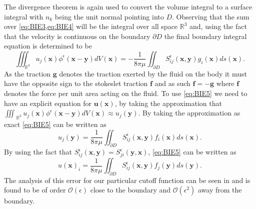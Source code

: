 The divergence theorem is again used to convert the volume integral to a surface integral with $n_k$ being the unit normal pointing into $D$. Observing that the sum over \cref{eq:BIE3,eq:BIE4} will be the integral over all space $\mathbb{R}^{3}$ and, using the fact that the velocity is continuous on the boundary $\partial D$ the final boundary integral equation is determined to be
\begin{equation}
  \label{eq:BIE5}
    \iiint_{\mathbb{R}^{3}} u_{j}(\bm{x}) \phi^{\epsilon}\left(\bm{x}-\bm{y}\right) d V(\bm{x})=-\frac{1}{8 \pi \mu} \iint_{\partial D} S_{i j}^{\epsilon}\left(\bm{x}, \bm{y}\right) g_{i}(\bm{x}) d s(\bm{x}).
\end{equation}
As the traction $\bm{g}$ denotes the traction exerted by the fluid on the body it must have the opposite sign to the stokeslet traction $\bm{f}$ and as such $\bm{f} = -\bm{g}$ where $\bm{f}$ denotes the force per unit area acting on the fluid. To use \cref{eq:BIE5} we need to have an explicit equation for $\bm{u}(\bm{x})$, by taking the approximation that $\iiint_{\;\mathbb{R}^{3}} u_{j}(\bm{x}) \phi^{\epsilon}\left(\bm{x}-\bm{y}\right) d V(\bm{x}) \approx u_j(\bm{y})$. By taking the approximation as exact \cref{eq:BIE5} can be written as
\begin{equation}
    u_j(\bm{y}) = \frac{1}{8 \pi \mu} \iint_{\partial D} S_{i j}^{\epsilon}\left(\bm{x}, \bm{y}\right) f_{i}(\bm{x}) d s(\bm{x}).
\end{equation}
By using the fact that $S_{i j}^{\epsilon}\left(\bm{x}, \bm{y}\right) = S_{j i}^{\epsilon}\left(\bm{y}, \bm{x}\right)$, \cref{eq:BIE5} can be written as 
\begin{equation}
  \label{eq:BIE}
    u(\bm{x})_i=\frac{1}{8 \pi \mu} \iint_{\partial D} S_{i j}^{\epsilon}\left(\bm{x}, \bm{y}\right) f_{j}(\bm{y}) d s(\bm{y}).
\end{equation}
The analysis of this error for our particular cutoff function can be seen in \cite{Cortez2005} and is found to be of order $\mathcal{O}(\epsilon)$ close to the boundary and $\mathcal{O}(\epsilon^2)$ away from the boundary.

